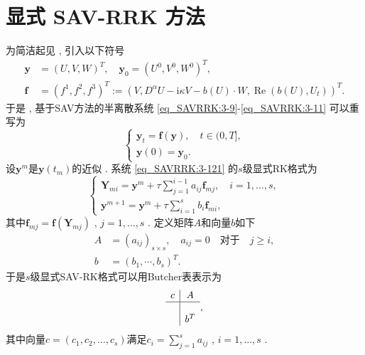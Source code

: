 \section{显式 SAV-RRK 方法}\label{Section_SAVRRK: 4}

为简洁起见 , 引入以下符号
\begin{equation}
	\begin{aligned}
		\bm{y}&=\left(U , V , W\right)^T , \quad\bm{y}_0=\left(U^0 , V^0 , W^0\right)^T  , \\
		\bm{f}&=(f^1 , f^2 , f^3)^T:=(V , D^{\alpha} U-\mathrm{i}\kappa V-b(U)\cdot W , \operatorname{Re}\left(b(U) , U_t\right))^T . 
	\end{aligned}
\end{equation}
于是 , 基于SAV方法的半离散系统 \eqref{eq_SAVRRK:3-9}-\eqref{eq_SAVRRK:3-11} 可以重写为
\begin{equation}
\left\{\begin{array}{l}
\bm{y}_t=\bm{f}(\bm{y}) , \quad t \in(0 , T] , \\
\bm{y}(0)=\bm{y}_0 . 
\end{array}\right . \label{eq_SAVRRK:3-121}
\end{equation}
设$\bm{y}^m$是$\bm{y}\left(t_m\right)$的近似 . 系统 \eqref{eq_SAVRRK:3-121} 的$s$级显式RK格式\cite{hairerRungeKuttaMethods2015}为
\begin{equation}
\left\{\begin{array}{l}
\bm{Y}_{m i}=\bm{y}^m+\tau \sum\limits_{j=1}^{i-1} a_{i j} \bm{f}_{m j} , \quad i=1 , \ldots , s , \\
\bm{y}^{m+1}=\bm{y}^m+\tau \sum\limits_{i=1}^s b_i \bm{f}_{m i} , 
\end{array}\right . \label{eq_SAVRRK:4-31}
\end{equation}
其中$\bm{f}_{m j}=\bm{f}\left(\bm{Y}_{m j}\right)$ , $j=1 , \ldots , s$ . 
定义矩阵$A$和向量$b$如下
\begin{equation}
\begin{aligned}
A & =\left(a_{i j}\right)_{s \times s} , \quad a_{i j}=0 \quad \text {对于} \quad j \geq i , \\
b & =\left(b_1 , \cdots , b_s\right)^T . 
\end{aligned}
\end{equation}
于是$s$级显式SAV-RK格式可以用Butcher表表示为
\begin{equation}
\begin{array}{c|c}
c & A \\
\hline \\
& b^T
\end{array} , 
\end{equation}
其中向量$c=(c_1 , c_2 , \dots , c_s)$满足$c_i=\sum\limits_{j=1}^s a_{i j}$ , $i=1 , \ldots , s$ . 

